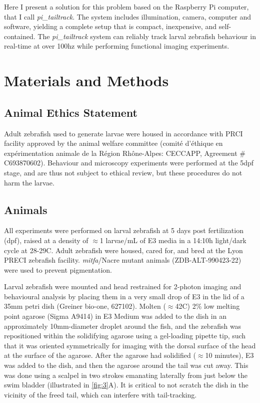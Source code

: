 \documentclass[9pt,lineno]{RandlettLab_elife}
\begin{document}
Here I present a solution for this problem based on the Raspberry Pi computer, that I call \emph{pi\_tailtrack}. The system includes illumination, camera, computer and software, yielding a complete setup that is compact, inexpensive, and self-contained. The \emph{pi\_tailtrack} system can reliably track larval zebrafish behaviour in real-time at over 100hz while performing functional imaging experiments. 

\newpage
\section{Materials and Methods}

\subsection{Animal Ethics Statement}

Adult zebrafish used to generate larvae were housed in accordance with PRCI facility approved by the animal welfare committee (comité d’éthique en expérimentation animale de la Région Rhône-Alpes: CECCAPP, Agreement \# C693870602). Behaviour and microscopy experiments were performed at the 5dpf stage, and are thus not subject to ethical review, but these procedures do not harm the larvae. 

\subsection{Animals}

All experiments were performed on larval zebrafish at 5 days post fertilization (dpf), raised at a density of $\approx$1 larvae/mL of E3 media in a 14:10h light/dark cycle at 28-29\degree{}C. Adult zebrafish were housed, cared for, and bred at the Lyon PRECI zebrafish facility. \textit{mitfa}/Nacre mutant animals (ZDB-ALT-990423-22) were used to prevent pigmentation. 

Larval zebrafish were mounted and head restrained for 2-photon imaging and behavioural analysis by placing them in a very small drop of E3 in the lid of a 35mm petri dish (Greiner bio-one, 627102). Molten ($\approx$42\degree{}C) 2\% low melting point agarose (Sigma A9414) in E3 Medium was added to the dish in an approximately 10mm-diameter droplet around the fish, and the zebrafish was repositioned within the solidifying agarose using a gel-loading pipette tip, such that it was oriented symmetrically for imaging with the dorsal surface of the head at the surface of the agarose. After the agarose had solidified ($\approx$10 minutes), E3 was added to the dish, and then the agarose around the tail was cut away. This was done using a scalpel in two strokes emanating laterally from just below the swim bladder (illustrated in \autoref{fig:3}A). It is critical to not scratch the dish in the vicinity of the freed tail, which can interfere with tail-tracking. 
\end{document}
